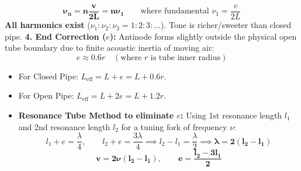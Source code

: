 \documentclass[10pt,a4paper]{article}
\begin{document}
\begin{formulabox}
\begin{equation}
  \mathbf{\nu_n = n \frac{v}{2L} = n \nu_1} \qquad \text{where fundamental } \nu_1 = \frac{v}{2L}
\end{equation}
\textbf{All harmonics exist} ($\nu_1 : \nu_2 : \nu_3 = 1 : 2 : 3 : \dots$). Tone is richer/sweeter than closed pipe.
\textbf{4. End Correction ($e$):}
Antinode forms slightly outside the physical open tube boundary due to finite acoustic inertia of moving air:
\begin{equation}
  e \approx 0.6 r \quad (\text{where } r \text{ is tube inner radius})
\end{equation}
\begin{itemize}
  \item For Closed Pipe: $L_{\text{eff}} = L + e = L + 0.6r$.
  \item For Open Pipe: $L_{\text{eff}} = L + 2e = L + 1.2r$.
  \item \textbf{Resonance Tube Method to eliminate $e$:}
  Using 1st resonance length $l_1$ and 2nd resonance length $l_2$ for a tuning fork of frequency $\nu$:
  \begin{equation}
    l_1 + e = \frac{\lambda}{4}, \qquad l_2 + e = \frac{3\lambda}{4} \implies l_2 - l_1 = \frac{\lambda}{2} \implies \mathbf{\lambda = 2(l_2 - l_1)}
  \end{equation}
  \begin{equation}
    \mathbf{v = 2\nu(l_2 - l_1)}, \qquad \mathbf{e = \frac{l_2 - 3l_1}{2}}
  \end{equation}
\end{itemize}
\end{formulabox}
\end{document}
